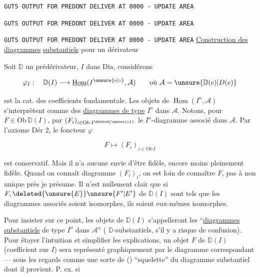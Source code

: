 \texttt{GUTS OUTPUT FOR PREDONT DELIVER AT 0000 - UPDATE AREA}

\texttt{GUTS OUTPUT FOR PREDONT DELIVER AT 0000 - UPDATE AREA}

\texttt{GUTS OUTPUT FOR PREDONT DELIVER AT 0000 - UPDATE AREA}
\uline{Construction des diagrammes} \uline{substantiels} pour un dérivateur

Soit $\mathbb D$ un prédérivateur, $I$ dans $\mathrm{Dia}$, considérons

\[
\varphi_I:\quad\mathbb D(I)\longrightarrow\underline{\operatorname{Hom}}(I^{\unsure{\mathrm o|\circ}},\mathcal A)
\qquad\text{où }\mathcal A=\unsure{\mathbb D(e)|D(e)}
\]

est la cat. des coefficients fondamentale. Les objets de $\underline{\operatorname{Hom}}(I^{\mathrm o},\mathcal A)$ s'interprètent comme des \uline{diagrammes de type} $I^{\mathrm o}$ dans $\mathcal A$.  Notons, pour $F\in\mathrm{Ob}\,\mathbb D(I)$, par  $(F_i)_{i\in\mathrm{Ob}\,I^{\deleted{\unsure{\mathrm o}}}}$ le $I^{\mathrm o}$-diagramme associé dans $\mathcal A$. Par l'axiome Dér 2, le foncteur $\varphi$

\[
F\longmapsto(F_i)_{i\in\mathrm{Ob}\,I}
\]

est conservatif. Mais il n'a aucune envie d'être fidèle, encore moins pleinement fidèle. Quand on connaît  diagramme $(F_i)_i$, on est loin de connaître $F$, pas  à  non unique près je présume. Il n'est nullement clair que si $F,\deleted{\unsure{E}}\unsure{F'|E'}$ de $\mathbb D(I)$ sont tels que les diagrammes associés soient isomorphes, ils soient eux-mêmes isomorphes.

Pour insister sur ce point, les objets de $\mathbb D(I)$ s'appelleront les ``\uline{diagrammes substantiels} de type $I^{\mathrm o}$ dans $\mathcal A$'' ( $\mathbb D$-substantiels, s'il y a risque de confusion). Pour étayer l'intuition et simplifier les explications, un objet $F$ de $\mathbb D(I)$ (coefficient sur $I$) sera représenté graphiquement par le diagramme  correspondant --- sous les regards
comme une sorte de () ``squelette'' du diagramme substantiel dont il provient. P. ex. si



